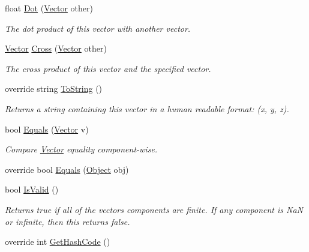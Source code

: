 \begin{DoxyCompactItemize}
float \mbox{\hyperlink{struct_leap_1_1_vector_a9177e8852525449bc0817f77de9a9804}{Dot}} (\mbox{\hyperlink{struct_leap_1_1_vector}{Vector}} other)
\begin{DoxyCompactList}\small\item\em The dot product of this vector with another vector. \end{DoxyCompactList}\item 
\mbox{\hyperlink{struct_leap_1_1_vector}{Vector}} \mbox{\hyperlink{struct_leap_1_1_vector_acdd326aa3bd6ac8eaf4d0c321db129cb}{Cross}} (\mbox{\hyperlink{struct_leap_1_1_vector}{Vector}} other)
\begin{DoxyCompactList}\small\item\em The cross product of this vector and the specified vector. \end{DoxyCompactList}\item 
override string \mbox{\hyperlink{struct_leap_1_1_vector_a0da414710f7b4d8bab10ed4685750599}{To\+String}} ()
\begin{DoxyCompactList}\small\item\em Returns a string containing this vector in a human readable format\+: (x, y, z). \end{DoxyCompactList}\item 
bool \mbox{\hyperlink{struct_leap_1_1_vector_aafba24baa2a58a85c0b07ba28b4a56de}{Equals}} (\mbox{\hyperlink{struct_leap_1_1_vector}{Vector}} v)
\begin{DoxyCompactList}\small\item\em Compare \mbox{\hyperlink{struct_leap_1_1_vector}{Vector}} equality component-\/wise. \end{DoxyCompactList}\item 
override bool \mbox{\hyperlink{struct_leap_1_1_vector_a024719e566f2af651da6494e0f5cd86c}{Equals}} (\mbox{\hyperlink{_t_m_pro___font_asset_creator_window_8cs_aef19bab18b9814edeef255c43e4f6bbc}{Object}} obj)
\item 
bool \mbox{\hyperlink{struct_leap_1_1_vector_aae57324c0e393fc8f8b799092964efbb}{Is\+Valid}} ()
\begin{DoxyCompactList}\small\item\em Returns true if all of the vector\textquotesingle{}s components are finite. If any component is NaN or infinite, then this returns false. \end{DoxyCompactList}\item 
override int \mbox{\hyperlink{struct_leap_1_1_vector_aa95778cb029f0b2b59e7077eb1c3c980}{Get\+Hash\+Code}} ()
\end{DoxyCompactItemize}
